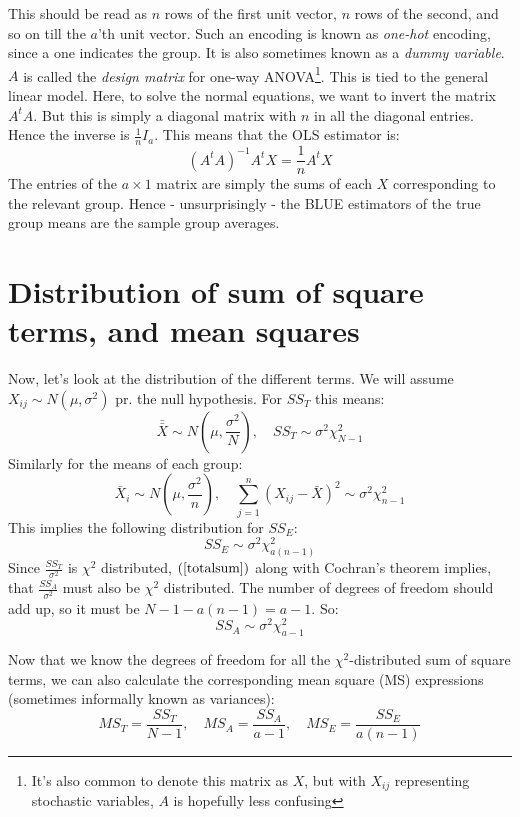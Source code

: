 \documentclass[12pt, a4paper]{article}
\newcommand*{\doublebar}[1]{\bar{\bar{#1}}}
\begin{document}
This should be read as $n$ rows of the first unit vector, $n$ rows of the second, and so on till the $a$'th unit vector. Such an encoding is known as \textit{one-hot} encoding, since a one indicates the group. It is also sometimes known as a \textit{dummy variable}. $A$ is called the \textit{design matrix} for one-way ANOVA\footnote{It's also common to denote this matrix as $X$, but with $X_{ij}$ representing stochastic variables, $A$ is hopefully less confusing}. This is tied to the general linear model. Here, to solve the normal equations, we want to invert the matrix $A^t A$. But this is simply a diagonal matrix with $n$ in all the diagonal entries. Hence the inverse is $\frac{1}{n}I_a$. This means that the OLS estimator is:
\begin{equation}
(A^t A)^{-1}A^t X=\frac{1}{n}A^t X
\end{equation}
The entries of the $a\times 1$ matrix are simply the sums of each $X$ corresponding to the relevant group. Hence - unsurprisingly - the BLUE estimators of the true group means are the sample group averages.

\section{Distribution of sum of square terms, and mean squares}
Now, let's look at the distribution of the different terms. We will assume $X_{ij}\sim N(\mu,\sigma^2)$ pr. the null hypothesis. For $SS_T$ this means:
\begin{equation}
\doublebar{X}\sim N\left(\mu,\frac{\sigma^2}{N}\right),\quad SS_T\sim\sigma^2\chi^2_{N-1}
\end{equation}
Similarly for the means of each group:
\begin{equation}
\bar{X}_i\sim N\left(\mu,\frac{\sigma^2}{n}\right),\quad\sum_{j=1}^n\left(X_{ij}-\bar{X}\right)^2\sim\sigma^2\chi^2_{n-1}
\end{equation}
This implies the following distribution for $SS_E$:
\begin{equation}
SS_E\sim\sigma^2\chi^2_{a(n-1)} 
\end{equation}
Since $\frac{SS_T}{\sigma^2}$ is $\chi^2$ distributed, $(\ref{totalsum})$ along with Cochran's theorem implies, that $\frac{SS_A}{\sigma^2}$ must also be $\chi^2$ distributed. The number of degrees of freedom should add up, so it must be $N-1-a(n-1)=a-1$. So:
\begin{equation}
SS_A\sim\sigma^2\chi^2_{a-1}
\end{equation}
\par
Now that we know the degrees of freedom for all the $\chi^2$-distributed sum of square terms, we can also calculate the corresponding mean square (MS) expressions (sometimes informally known as variances): 
\begin{equation}
\label{msformulas}
MS_T=\frac{SS_T}{N-1},\quad MS_A=\frac{SS_A}{a-1},\quad MS_E=\frac{SS_E}{a(n-1)}
\end{equation}
\end{document}
